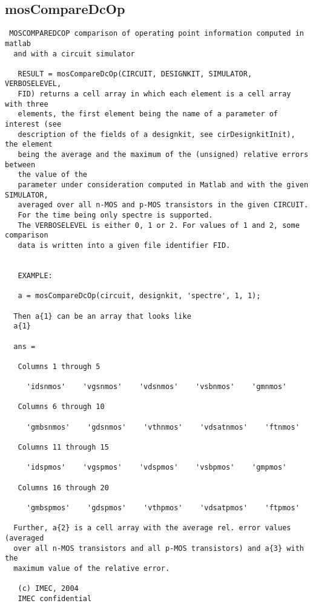 \subsection{mosCompareDcOp}
\label{sec:mosCompareDcOp}
\begin{verbatim}
 MOSCOMPAREDCOP comparison of operating point information computed in matlab 
  and with a circuit simulator
 
   RESULT = mosCompareDcOp(CIRCUIT, DESIGNKIT, SIMULATOR, VERBOSELEVEL,
   FID) returns a cell array in which each element is a cell array with three
   elements, the first element being the name of a parameter of interest (see
   description of the fields of a designkit, see cirDesignkitInit), the element
   being the average and the maximum of the (unsigned) relative errors between
   the value of the 
   parameter under consideration computed in Matlab and with the given SIMULATOR,
   averaged over all n-MOS and p-MOS transistors in the given CIRCUIT. 
   For the time being only spectre is supported.
   The VERBOSELEVEL is either 0, 1 or 2. For values of 1 and 2, some comparison
   data is written into a given file identifier FID.
 
 
   EXAMPLE:
 
   a = mosCompareDcOp(circuit, designkit, 'spectre', 1, 1);
 
  Then a{1} can be an array that looks like
  a{1}
 
  ans = 
 
   Columns 1 through 5
 
     'idsnmos'    'vgsnmos'    'vdsnmos'    'vsbnmos'    'gmnmos'
 
   Columns 6 through 10
 
     'gmbsnmos'    'gdsnmos'    'vthnmos'    'vdsatnmos'    'ftnmos'
 
   Columns 11 through 15
 
     'idspmos'    'vgspmos'    'vdspmos'    'vsbpmos'    'gmpmos'
 
   Columns 16 through 20
 
     'gmbspmos'    'gdspmos'    'vthpmos'    'vdsatpmos'    'ftpmos'
 
  Further, a{2} is a cell array with the average rel. error values (averaged
  over all n-MOS transistors and all p-MOS transistors) and a{3} with the
  maximum value of the relative error.  
 
   (c) IMEC, 2004
   IMEC confidential 
 

\end{verbatim}

